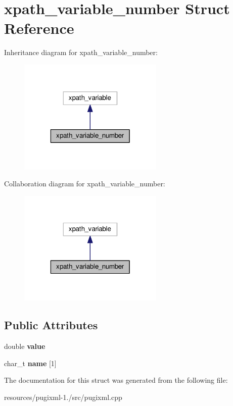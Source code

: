 \hypertarget{structxpath__variable__number}{\section{xpath\+\_\+variable\+\_\+number Struct Reference}
\label{structxpath__variable__number}
}


Inheritance diagram for xpath\+\_\+variable\+\_\+number\+:
\nopagebreak
\begin{figure}[H]
\begin{center}
\leavevmode
\includegraphics[width=196pt]{structxpath__variable__number__inherit__graph}
\end{center}
\end{figure}


Collaboration diagram for xpath\+\_\+variable\+\_\+number\+:
\nopagebreak
\begin{figure}[H]
\begin{center}
\leavevmode
\includegraphics[width=196pt]{structxpath__variable__number__coll__graph}
\end{center}
\end{figure}
\subsection*{Public Attributes}
\begin{DoxyCompactItemize}
\item 
\hypertarget{structxpath__variable__number_a49949397348e7c941d88a694ec5c8e57}{double {\bfseries value}}\label{structxpath__variable__number_a49949397348e7c941d88a694ec5c8e57}

\item 
\hypertarget{structxpath__variable__number_a2bf4163dab1a8e233d45677fee987f0f}{char\+\_\+t {\bfseries name} \mbox{[}1\mbox{]}}\label{structxpath__variable__number_a2bf4163dab1a8e233d45677fee987f0f}

\end{DoxyCompactItemize}


The documentation for this struct was generated from the following file\+:\begin{DoxyCompactItemize}
\item 
resources/pugixml-\/1./src/pugixml.\+cpp\end{DoxyCompactItemize}
